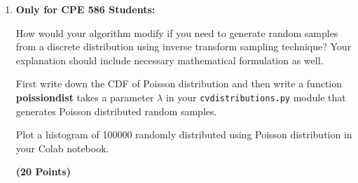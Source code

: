 \documentclass[12pt, xcolor=dvipsnames,svgnames,x11names]{article}
\begin{document}
\begin{enumerate}
Thus, we can get an exponentially distributed random sample in two steps:

\begin{enumerate}
\item Generate a sample $y$ from $U(0,1)$.
\item Set $x = -\frac{1}{\lambda}\ln(y)$.
\end{enumerate}
Repeat for all $n$ samples you want to generate.

Create a function called \textbf{exponentialdist} in your \texttt{cvdistributions.py} module that takes $\lambda$ as an argument and returns a rnadom sample that is exponentially distributed.

Plot a histogram of 100000 randomly distributed using exponential distribution in your Colab notebook.

\textbf{(10 Points)}

\item \textbf{Only for CPE 586 Students:}

How would your algorithm modify if you need to generate random samples from a discrete distribution using inverse transform sampling technique? Your explanation should include necessary mathematical formulation as well.

First write down the CDF of Poisson distribution and then write a function \textbf{poissiondist} takes a parameter $\lambda$ in your \texttt{cvdistributions.py} module that generates 
Poisson distributed random samples.

 Plot a histogram of 100000 randomly distributed using Poisson distribution in your Colab notebook.


\textbf{(20 Points)}

\end{enumerate}
\end{document}
